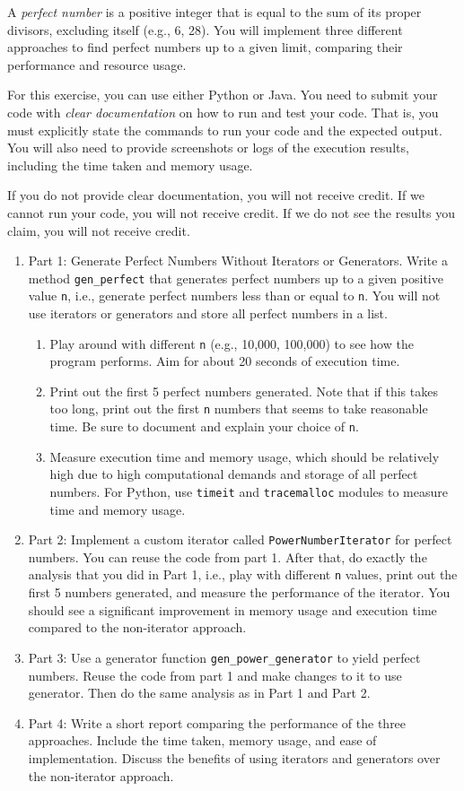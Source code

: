 \documentclass[oneside,11pt,dvipsnames]{book}
\newcommand{\code}[1]{\texttt{#1}}
\begin{document}
A \emph{perfect number} is a positive integer that is equal to the sum of its proper divisors, excluding itself (e.g., 6, 28). You will implement three different approaches to find perfect numbers up to a given limit, comparing their performance and resource usage.  

For this exercise, you can use either Python or Java. You need to submit your code with \emph{clear documentation} on how to run and test your code. That is, you must explicitly state the commands to run your code and the expected output. You will also need to provide screenshots or logs of the execution results, including the time taken and memory usage.  

If you do not provide clear documentation, you will not receive credit. If we cannot run your code, you will not receive credit. If we do not see the results you claim, you will not receive credit. 

\begin{enumerate}
\item Part 1: Generate Perfect Numbers Without Iterators or Generators.  Write a method \code{gen\_perfect} that generates perfect numbers up to a given positive value \code{n}, i.e., generate perfect numbers less than or equal to \code{n}.  You will not use iterators or generators and store all perfect numbers in a list.
\begin{enumerate}
    \item Play around with different \code{n} (e.g., 10,000, 100,000) to see how the program performs. Aim for about 20 seconds of execution time.
    \item Print out the first 5 perfect numbers generated. Note that if this takes too long, print out the first \code{n} numbers that seems to take reasonable time.  Be sure to document and explain your choice of \code{n}.
    \item Measure execution time and memory usage, which should be relatively high due to high computational demands and storage of all perfect numbers.  For Python, use \code{timeit} and \code{tracemalloc} modules to measure time and memory usage.
\end{enumerate}

\item Part 2: Implement a custom iterator called \code{PowerNumberIterator} for perfect numbers. You can reuse the code from part 1.  After that, do exactly the analysis that you did in Part 1, i.e., play with different \code{n} values, print out the first 5 numbers generated, and measure the performance of the iterator.  You should see a significant improvement in memory usage and execution time compared to the non-iterator approach.
\item Part 3: Use a generator function \code{gen\_power\_generator} to yield perfect numbers.  Reuse the code from part 1 and make changes to it to use generator.  Then do the same analysis as in Part 1 and Part 2.
\item Part 4: Write a short report comparing the performance of the three approaches.  Include the time taken, memory usage, and ease of implementation.  Discuss the benefits of using iterators and generators over the non-iterator approach.
\end{enumerate}
\end{document}
